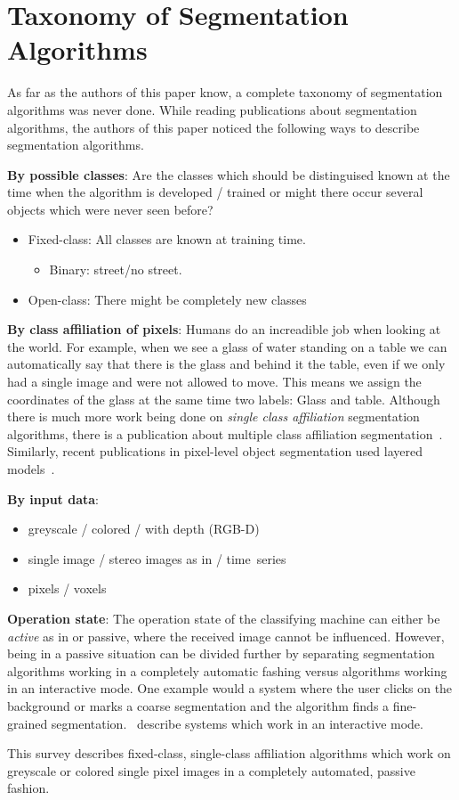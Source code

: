 \section{Taxonomy of Segmentation Algorithms}\label{sec:taxonomy}
As far as the authors of this paper know, a complete taxonomy of segmentation
algorithms was never done. While reading publications about segmentation
algorithms, the authors of this paper noticed the following ways to describe
segmentation algorithms.

\textbf{By possible classes}: Are the classes which should be distinguised
known at the time when the algorithm is developed / trained or might there
occur several objects which were never seen before?
\begin{itemize}
    \item Fixed-class: All classes are known at training time.
          \begin{itemize}
              \item Binary: street/no street.
          \end{itemize}
    \item Open-class: There might be completely new classes
\end{itemize}

\textbf{By class affiliation of pixels}: Humans do an increadible job when
looking at the world. For example, when we see a glass of water standing on a
table we can automatically say that there is the glass and behind it the table,
even if we only had a single image and were not allowed to move. This means we
assign the coordinates of the glass at the same time two labels: Glass and
table. Although there is much more work being done on \textit{single class
affiliation} segmentation algorithms, there is a publication about multiple
class affiliation segmentation~\cite{levin2008spectral}. Similarly, recent
publications in pixel-level object segmentation used layered
models~\cite{yang2012layered}.

\textbf{By input data}:
\begin{itemize}
    \item greyscale / colored / with depth (RGB-D)
    \item single image / stereo images as in \cite{boykov2001fast} /
          time~series
    \item pixels / voxels \cite{wolz2012multi}
\end{itemize}

\textbf{Operation state}: The operation state of the classifying machine can
either be \textit{active} as in
\cite{schiebener2011segmentation,schiebener2012discovery} or passive, where the
received image cannot be influenced. However, being in a passive situation can
be divided further by separating segmentation algorithms working in a
completely automatic fashing versus algorithms working in an interactive mode.
One example would a system where the user clicks on the background or marks a
coarse segmentation and the algorithm finds a fine-grained segmentation.
\cite{boykov2000interactive,rother2004grabcut,protiere2007interactive}~describe
systems which work in an interactive mode.

This survey describes fixed-class, single-class affiliation algorithms which
work on greyscale or colored single pixel images in a completely automated,
passive fashion.
